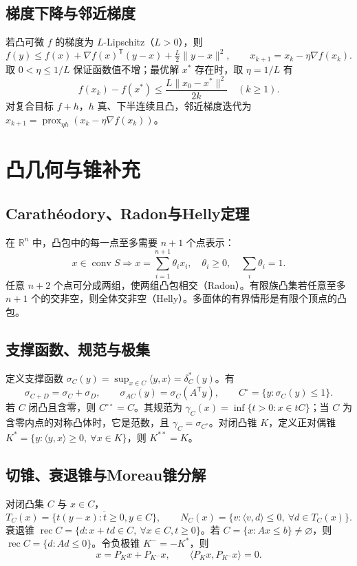 \documentclass[../main.tex]{subfiles}
\begin{document}
\subsection{梯度下降与邻近梯度}
若凸可微 $f$ 的梯度为 $L$-Lipschitz（$L>0$），则
\[
f(y)\le f(x)+\nabla f(x)^{\mathsf T}(y-x)+\tfrac L2\|y-x\|^2,
\qquad x_{k+1}=x_k-\eta\nabla f(x_k).
\]
取 $0<\eta\le1/L$ 保证函数值不增；最优解 $x^*$ 存在时，取 $\eta=1/L$ 有
\[
f(x_k)-f(x^*)\le\frac{L\|x_0-x^*\|^2}{2k}\quad(k\ge1).
\]
对复合目标 $f+h$，$h$ 真、下半连续且凸，邻近梯度迭代为 $x_{k+1}=\operatorname{prox}_{\eta h}(x_k-\eta\nabla f(x_k))$。
\section{凸几何与锥补充}
\subsection{Carathéodory、Radon与Helly定理}
在 $\mathbb R^n$ 中，凸包中的每一点至多需要 $n+1$ 个点表示：
\[
x\in\operatorname{conv}S\Longrightarrow x=\sum_{i=1}^{n+1}\theta_ix_i,\quad
\theta_i\ge0,\quad\sum_i\theta_i=1.
\]
任意 $n+2$ 个点可分成两组，使两组凸包相交（Radon）。有限族凸集若任意至多 $n+1$ 个的交非空，则全体交非空（Helly）。多面体的有界情形是有限个顶点的凸包。
\subsection{支撑函数、规范与极集}
定义支撑函数 $\sigma_C(y)=\sup_{x\in C}\langle y,x\rangle=\delta_C^*(y)$。有
\[
\sigma_{C+D}=\sigma_C+\sigma_D,\qquad
\sigma_{AC}(y)=\sigma_C(A^{\mathsf T}y),\qquad
C^\circ=\{y:\sigma_C(y)\le1\}.
\]
若 $C$ 闭凸且含零，则 $C^{\circ\circ}=C$。其规范为 $\gamma_C(x)=\inf\{t>0:x\in tC\}$；当 $C$ 为含零内点的对称凸体时，它是范数，且 $\gamma_C=\sigma_{C^\circ}$。对闭凸锥 $K$，定义正对偶锥 $K^*=\{y:\langle y,x\rangle\ge0,\ \forall x\in K\}$，则 $K^{**}=K$。
\subsection{切锥、衰退锥与Moreau锥分解}
对闭凸集 $C$ 与 $x\in C$，
\[
T_C(x)=\overline{\{t(y-x):t\ge0,y\in C\}},\qquad
N_C(x)=\{v:\langle v,d\rangle\le0,\ \forall d\in T_C(x)\}.
\]
衰退锥 $\operatorname{rec}C=\{d:x+td\in C,\ \forall x\in C,t\ge0\}$。若 $C=\{x:Ax\le b\}\ne\varnothing$，则 $\operatorname{rec}C=\{d:Ad\le0\}$。令负极锥 $K^-=-K^*$，则
\[
x=P_Kx+P_{K^-}x,\qquad\langle P_Kx,P_{K^-}x\rangle=0.
\]
\end{document}
